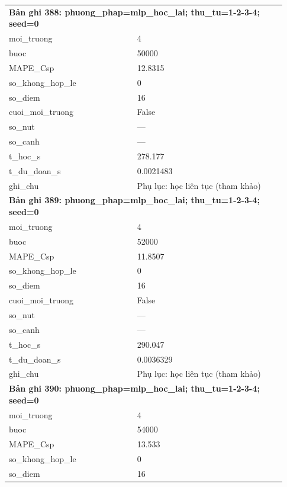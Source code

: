 \begin{longtable}{p{0.43\linewidth}p{0.50\linewidth}}
\midrule
\multicolumn{2}{p{0.95\linewidth}}{\textbf{Bản ghi 388: phuong\_phap=mlp\_hoc\_lai; thu\_tu=1-2-3-4; seed=0}} \\
moi\_\allowbreak truong & 4 \\
buoc & 50000 \\
MAPE\_\allowbreak Csp & 12.8315 \\
so\_\allowbreak khong\_\allowbreak hop\_\allowbreak le & 0 \\
so\_\allowbreak diem & 16 \\
cuoi\_\allowbreak moi\_\allowbreak truong & False \\
so\_\allowbreak nut & — \\
so\_\allowbreak canh & — \\
t\_\allowbreak hoc\_\allowbreak s & 278.177 \\
t\_\allowbreak du\_\allowbreak doan\_\allowbreak s & 0.0021483 \\
ghi\_\allowbreak chu & Phụ lục: học liên tục (tham khảo) \\
\midrule
\multicolumn{2}{p{0.95\linewidth}}{\textbf{Bản ghi 389: phuong\_phap=mlp\_hoc\_lai; thu\_tu=1-2-3-4; seed=0}} \\
moi\_\allowbreak truong & 4 \\
buoc & 52000 \\
MAPE\_\allowbreak Csp & 11.8507 \\
so\_\allowbreak khong\_\allowbreak hop\_\allowbreak le & 0 \\
so\_\allowbreak diem & 16 \\
cuoi\_\allowbreak moi\_\allowbreak truong & False \\
so\_\allowbreak nut & — \\
so\_\allowbreak canh & — \\
t\_\allowbreak hoc\_\allowbreak s & 290.047 \\
t\_\allowbreak du\_\allowbreak doan\_\allowbreak s & 0.0036329 \\
ghi\_\allowbreak chu & Phụ lục: học liên tục (tham khảo) \\
\midrule
\multicolumn{2}{p{0.95\linewidth}}{\textbf{Bản ghi 390: phuong\_phap=mlp\_hoc\_lai; thu\_tu=1-2-3-4; seed=0}} \\
moi\_\allowbreak truong & 4 \\
buoc & 54000 \\
MAPE\_\allowbreak Csp & 13.533 \\
so\_\allowbreak khong\_\allowbreak hop\_\allowbreak le & 0 \\
so\_\allowbreak diem & 16 \\

\end{longtable}
